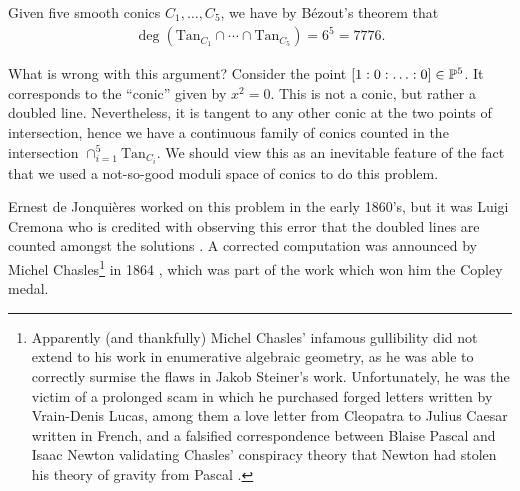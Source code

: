 \documentclass[11pt]{amsart}
\providecommand{\Tan}{\mathrm{Tan}}
\begin{document}
\begin{theorem}
Given five smooth conics $C_1, \ldots, C_5$, we have by B\'{e}zout's theorem that
\begin{align*}
    \deg(\Tan_{C_1} \cap \cdots \cap \Tan_{C_5}) = 6^5 = 7776.
\end{align*}
\end{theorem}

%
What is wrong with this argument? Consider the point $[1:0: \ldots : 0]\in \P^5$. It corresponds to the ``conic'' given by $x^2 = 0$. This is not a conic, but rather a doubled line. Nevertheless, it is tangent to any other conic at the two points of intersection, hence we have a continuous family of conics counted in the intersection $\cap_{i=1}^5 \Tan_{C_i}$. We should view this as an inevitable feature of the fact that we used a not-so-good moduli space of conics to do this problem.

Ernest de Jonquières worked on this problem in the early 1860's, but it was Luigi Cremona who is credited with observing this error that the doubled lines are counted amongst the solutions \cite[pp.~118-119]{Kleiman-Chasles}. A corrected computation was announced by Michel Chasles\footnote{%
Apparently (and thankfully) Michel Chasles' infamous gullibility did not extend to his work in enumerative algebraic geometry, as he was able to correctly surmise the flaws in Jakob Steiner's work. Unfortunately, he was the victim of a prolonged scam in which he purchased forged letters written by Vrain-Denis Lucas, among them a love letter from Cleopatra to Julius Caesar written in French, and a falsified correspondence between Blaise Pascal and Isaac Newton validating Chasles' conspiracy theory that Newton had stolen his theory of gravity from Pascal \cite[VI.4]{Farquhar-deception}.%
}
in 1864 \cite{Chasles-conics}, which was part of the work which won him the Copley medal.
\end{document}
